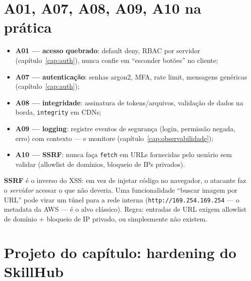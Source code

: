 \section{A01, A07, A08, A09, A10 na prática}

\begin{itemize}[leftmargin=*, itemsep=0.4em]
  \item \textbf{A01 — acesso quebrado}: default deny, RBAC por servidor (capítulo~\ref{cap:auth}), nunca confie em ``esconder botões'' no cliente;
  \item \textbf{A07 — autenticação}: senhas argon2, MFA, rate limit, mensagens genéricas (capítulo~\ref{cap:auth});
  \item \textbf{A08 — integridade}: assinatura de tokens/arquivos, validação de dados na borda, \texttt{integrity} em CDNs;
  \item \textbf{A09 — logging}: registre eventos de segurança (login, permissão negada, erro) com contexto — e monitore (capítulo~\ref{cap:observabilidade});
  \item \textbf{A10 — SSRF}: nunca faça \texttt{fetch} em URLs fornecidas pelo usuário sem validar (allowlist de domínios, bloqueio de IPs privados).
\end{itemize}

\begin{caixaconceito}
\textbf{SSRF} é o inverso do XSS: em vez de injetar código no navegador, o
atacante faz o \emph{servidor} acessar o que não deveria. Uma funcionalidade
``buscar imagem por URL'' pode virar um túnel para a rede interna
(\texttt{http://169.254.169.254} — o metadata da AWS — é o alvo clássico).
Regra: entradas de URL exigem allowlist de domínio + bloqueio de IP privado,
ou simplesmente não existem.
\end{caixaconceito}

\section{Projeto do capítulo: hardening do SkillHub}
\label{sec:projeto19}

